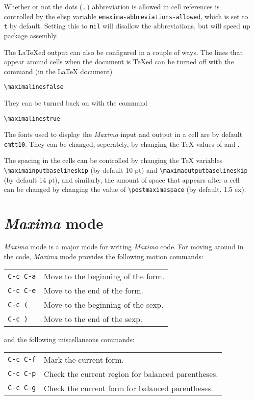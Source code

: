 \documentclass{article}
\newcommand{\mx}{\textsl{\sffamily Maxima}}
\begin{document}
Whether or not the dots (\dots{}) abbreviation is allowed in cell
references is controlled by the elisp variable
\texttt{emaxima-abbreviations-allowed}, which is set to \texttt{t} by
default.  Setting this to \texttt{nil} will disallow the abbreviations,
but will speed up package assembly.

The \LaTeX{}ed output can also be configured in a couple of ways.
The lines that appear around cells when the document is \TeX{}ed can be
turned off with the command (in the \LaTeX{} document)
\begin{verbatim}
\maximalinesfalse
\end{verbatim}
\noindent
They can be turned back on with the command
\begin{verbatim}
\maximalinestrue
\end{verbatim}

The fonts used to display the \mx{} input and output in a cell are by
default \texttt{cmtt10}.  They can be changed, seperately, by changing the
\TeX{} values of \texttt{\maximainputfont} and \texttt{\maximaoutputfont}.

The spacing in the cells can be controlled by changing the \TeX{}
variables \verb+\maximainputbaselineskip+ (by default 10 pt) and
\verb+\maximaoutputbaselineskip+ (by default 14 pt), and similarly, the
amount of space that appears after a cell can be changed by changing the
value of \verb+\postmaximaspace+ (by default, 1.5 ex).


\section{\mx{} mode}

\noindent
\mx{} mode is a major mode for writing \mx{} code.
For moving around in the code, \mx{} mode provides the following
motion commands: 

\begin{tabular}{p{\firstcol}p{\secondcol}}
\texttt{C-c C-a} & Move to the beginning of the form.\\
\texttt{C-c C-e} & Move to the end of the form.\\
\texttt{C-c (} & Move to the beginning of the sexp.\\
\texttt{C-c )} & Move to the end of the sexp.
\end{tabular}

\noindent
and the following miscellaneous commands:

\begin{tabular}{p{\firstcol}p{\secondcol}}
\texttt{C-c C-f} & Mark the current form.\\
\texttt{C-c C-p} & Check the current region for balanced parentheses.\\
\texttt{C-c C-g} & Check the current form for balanced parentheses.
\end{tabular}
\end{document}
